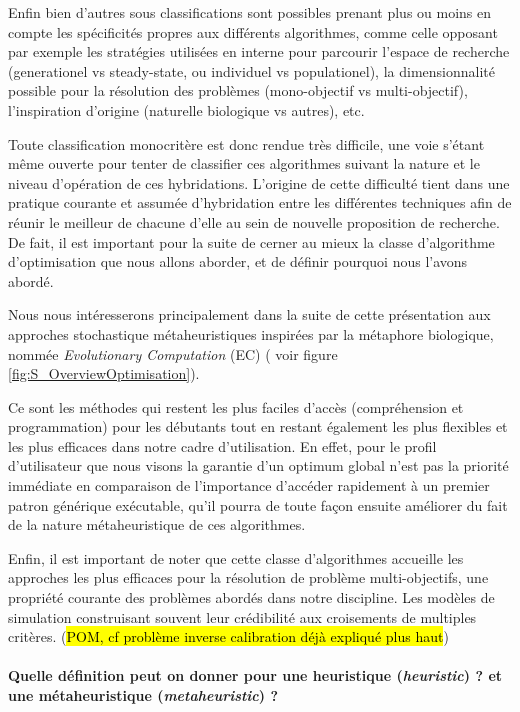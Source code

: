 Enfin bien d'autres sous classifications sont possibles prenant plus ou moins en compte les spécificités propres aux différents algorithmes, comme celle opposant par exemple les stratégies utilisées en interne pour parcourir l'espace de recherche (generationel vs steady-state, ou individuel vs populationel), la dimensionnalité possible pour la résolution des problèmes (mono-objectif vs multi-objectif), l'inspiration d'origine (naturelle biologique vs autres), etc. 

Toute classification monocritère est donc rendue très difficile, une voie s'étant même ouverte pour tenter de classifier ces algorithmes suivant la nature et le niveau d'opération de ces hybridations. L'origine de cette difficulté tient dans une pratique courante et assumée d'hybridation entre les différentes techniques afin de réunir le meilleur de chacune d'elle au sein de nouvelle proposition de recherche. De fait, il est important pour la suite de cerner au mieux la classe d'algorithme d'optimisation que nous allons aborder, et de définir pourquoi nous l'avons abordé.

Nous nous intéresserons principalement dans la suite de cette présentation aux approches stochastique métaheuristiques inspirées par la métaphore biologique, nommée \textit{Evolutionary Computation} (EC) ( voir figure \ref{fig:S_OverviewOptimisation}).  

Ce sont les méthodes qui restent les plus faciles d'accès (compréhension et programmation) pour les débutants tout en restant également les plus flexibles et les plus efficaces dans notre cadre d'utilisation. En effet, pour le profil d'utilisateur que nous visons la garantie d'un optimum global n'est pas la priorité immédiate en comparaison de l'importance d'accéder rapidement à un premier patron générique exécutable, qu'il pourra de toute façon ensuite améliorer du fait de la nature métaheuristique de ces algorithmes. 

Enfin, il est important de noter que cette classe d'algorithmes accueille les approches les plus efficaces pour la résolution de problème multi-objectifs, une propriété courante des problèmes abordés dans notre discipline. Les modèles de simulation construisant souvent leur crédibilité aux croisements de multiples critères. (\hl{POM, cf problème inverse calibration déjà expliqué plus haut})


\paragraph{Quelle définition peut on donner pour une heuristique (\textit{heuristic}) ? et une métaheuristique (\textit{metaheuristic}) ?}

